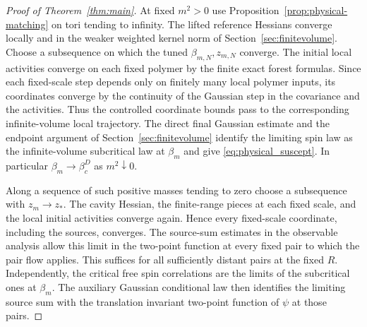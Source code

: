\documentclass[11pt]{article}
\begin{document}
\begin{proof}[Proof of Theorem~\ref{thm:main}]
At fixed \(m^2>0\) use Proposition~\ref{prop:physical-matching}
on tori tending to infinity. The lifted reference Hessians
converge locally and in the weaker weighted kernel norm
of Section~\ref{sec:finitevolume}. Choose a subsequence on
which the tuned \(\beta_{m,N},z_{m,N}\) converge. The
initial local activities converge on each fixed polymer
by the finite exact forest formulas. Since each fixed-scale
step depends only on finitely many local polymer inputs,
its coordinates converge by the continuity of the Gaussian
step in the covariance and the activities. Thus the
controlled coordinate bounds pass to the corresponding
infinite-volume local trajectory. The direct final Gaussian
estimate and the endpoint argument of
Section~\ref{sec:finitevolume} identify the limiting spin
law as the infinite-volume subcritical law at \(\beta_m\)
and give \eqref{eq:physical_suscept}. In particular
\(\beta_m\to\beta_c^D\) as \(m^2\downarrow0\).

Along a sequence of such positive masses tending to zero
choose a subsequence with \(z_m\to z_*\). The cavity Hessian,
the finite-range pieces at each fixed scale, and the local
initial activities converge again. Hence every fixed-scale
coordinate, including the sources, converges. The source-sum
estimates in the observable analysis allow this limit in the
two-point function at every fixed pair to which the pair
flow applies. This suffices for all sufficiently distant pairs
at the fixed \(R\). Independently, the critical free spin
correlations are the limits of the subcritical ones at
\(\beta_m\). The auxiliary Gaussian conditional law then
identifies the limiting source sum with the translation
invariant two-point function of \(\psi\) at those pairs.


\end{proof}
\end{document}
